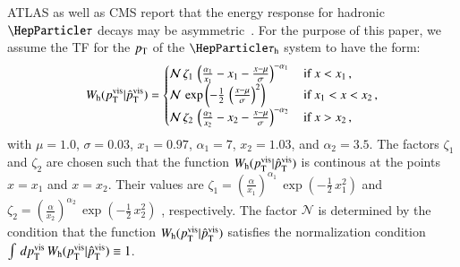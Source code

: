 ATLAS as well as CMS report that the energy response for hadronic
$\Pgt$ decays may be asymmetric~\cite{ATLAS:2011tfa,PRF-14-001}.
For the purpose of this paper, we assume the TF for the $p_{\textrm{T}}$ of the
$\tauh$ system to have the form:
\begin{equation}
W_{\textrm{h}}( p_{\textrm{T}}^{\textrm{vis}} | \hat{p}_{\textrm{T}}^{\textrm{vis}} ) = 
 \begin{cases}
   \mathcal{N} \, \zeta_{1} \, \left( \frac{\alpha_{1}}{x_{1}} - x_{1} - \frac{x - \mu}{\sigma} \right)^{-\alpha_{1}} \,  
 & \mbox{if } x < x_{1} \, , \\
   \mathcal{N} \, \exp\left( -\frac{1}{2} \, \left( \frac{x - \mu}{\sigma} \right)^{2} \right) \,
 & \mbox{if } x_{1} < x < x_{2} \, , \\
   \mathcal{N} \, \zeta_{2} \, \left( \frac{\alpha_{2}}{x_{2}} - x_{2} - \frac{x - \mu}{\sigma} \right)^{-\alpha_{2}} \,
 & \mbox{if } x > x_{2} \, ,
 \end{cases}
\label{eq:tf_tauToHadDecays_pT}
\end{equation}
with $\mu = 1.0$, $\sigma = 0.03$, $x_{1} = 0.97$, $\alpha_{1} = 7$,
$x_{2} = 1.03$, and $\alpha_{2} = 3.5$.
The factors $\zeta_{1}$ and $\zeta_{2}$ are chosen such that the
function $W_{\textrm{h}}( p_{\textrm{T}}^{\textrm{vis}} | \hat{p}_{\textrm{T}}^{\textrm{vis}} )$ is continous at
the points $x = x_{1}$ and $x = x_{2}$. 
Their values are $\zeta_{1} = \left( \frac{\alpha}{x_{1}}
\right)^{\alpha_{1}} \, \exp\left( -\frac{1}{2} \, x_{1}^{2} \right)$ and $\zeta_{2} = \left( \frac{\alpha}{x_{2}}
\right)^{\alpha_{2}} \, \exp\left( -\frac{1}{2} \, x_{2}^{2} \right)$
, respectively.
The factor $\mathcal{N}$ is determined by the condition that the function $W_{\textrm{h}}( p_{\textrm{T}}^{\textrm{vis}} | \hat{p}_{\textrm{T}}^{\textrm{vis}} )$ 
satisfies the normalization condition $\int \, dp_{\textrm{T}}^{\textrm{vis}} \, W_{\textrm{h}}( p_{\textrm{T}}^{\textrm{vis}} | \hat{p}_{\textrm{T}}^{\textrm{vis}} ) \equiv 1$.

